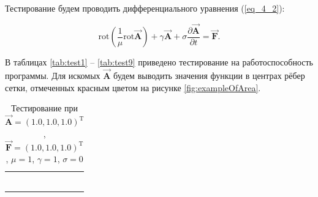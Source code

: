 Тестирование будем проводить дифференциального уравнения (\ref{eq_4_2}):

\begin{equation} \label{eq_4_2}
	\text{rot} \left(\frac{1}{\mu} \text{rot} \overrightarrow{\textbf{A}}\right) + \gamma \overrightarrow{\textbf{A}} + \sigma \frac{\partial \overrightarrow{\textbf{A}}}{\partial t} = \overrightarrow{\textbf{F}}.
\end{equation}

В таблицах \ref{tab:test1} -- \ref{tab:test9} приведено тестирование на работоспособность программы. Для искомых $\overrightarrow{\textbf{A}}$ будем выводить значения функции в центрах рёбер сетки, отмеченных красным цветом на рисунке \ref{fig:exampleOfArea}.

\begin{table}
	\caption{Тестирование при $\overrightarrow{\textbf{A}} = (1.0, 1.0, 1.0)^{\text{T}}$, $\overrightarrow{\textbf{F}} = (1.0, 1.0, 1.0)^{\text{T}}$, $\mu = 1$, $\gamma = 1$, $\sigma = 0$}
	\centering
	\small
	\begin{tabularx}{1.0\textwidth}{| >{\raggedright\arraybackslash}X | >{\raggedright\arraybackslash}X | >{\raggedright\arraybackslash}X |>{\raggedright\arraybackslash}X |}
		\hline
		\centering{Ребро} & \centering{Значение} & \centering{Абсолютная погрешность} & \centering{Относительная погрешность} \tabularnewline \hline
		
		
		\centering{($x; 1.0; 1.0$)} & \centering{1.00000000E+000}& \centering{0.00000000E+000} & \centering{0.00000000E+000} \tabularnewline \hline
		
		\centering{($x; 2.0; 1.0$)} & \centering{1.00000000E+000}& \centering{0.00000000E+000} & \centering{0.00000000E+000} \tabularnewline \hline
		
		\centering{($x; 1.0; 2.0$)} & \centering{1.00000000E+000}& \centering{0.00000000E+000} & \centering{0.00000000E+000} \tabularnewline \hline
		
		\centering{($x; 2.0; 2.0$)} & \centering{1.00000000E+000}& \centering{0.00000000E+000} & \centering{0.00000000E+000} \tabularnewline \hline
		
		
		
		\centering{($1.0; y; 1.0$)} & \centering{1.00000000E+000}& \centering{0.00000000E+000} & \centering{0.00000000E+000} \tabularnewline \hline
		
		\centering{($2.0; y; 1.0$)} & \centering{1.00000000E+000}& \centering{0.00000000E+000} & \centering{0.00000000E+000} \tabularnewline \hline
		

\end{tabularx}
\end{table}

